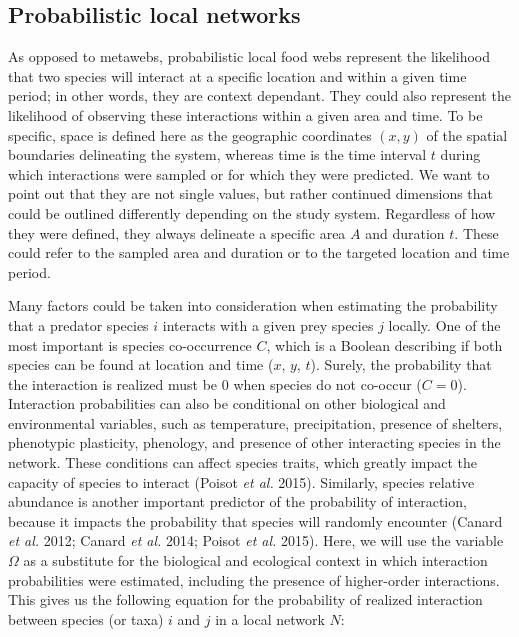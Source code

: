 \documentclass[11pt]{article}
\begin{document}
\hypertarget{probabilistic-local-networks}{%
\subsection{Probabilistic local
networks}\label{probabilistic-local-networks}}

As opposed to metawebs, probabilistic local food webs represent the
likelihood that two species will interact at a specific location and
within a given time period; in other words, they are context dependant.
They could also represent the likelihood of observing these interactions
within a given area and time. To be specific, space is defined here as
the geographic coordinates \((x, y)\) of the spatial boundaries
delineating the system, whereas time is the time interval \(t\) during
which interactions were sampled or for which they were predicted. We
want to point out that they are not single values, but rather continued
dimensions that could be outlined differently depending on the study
system. Regardless of how they were defined, they always delineate a
specific area \(A\) and duration \(t\). These could refer to the sampled
area and duration or to the targeted location and time period.

Many factors could be taken into consideration when estimating the
probability that a predator species \(i\) interacts with a given prey
species \(j\) locally. One of the most important is species
co-occurrence \(C\), which is a Boolean describing if both species can
be found at location and time (\(x\), \(y\), \(t\)). Surely, the
probability that the interaction is realized must be \(0\) when species
do not co-occur (\(C = 0\)). Interaction probabilities can also be
conditional on other biological and environmental variables, such as
temperature, precipitation, presence of shelters, phenotypic plasticity,
phenology, and presence of other interacting species in the network.
These conditions can affect species traits, which greatly impact the
capacity of species to interact (Poisot \emph{et al.} 2015). Similarly,
species relative abundance is another important predictor of the
probability of interaction, because it impacts the probability that
species will randomly encounter (Canard \emph{et al.} 2012; Canard
\emph{et al.} 2014; Poisot \emph{et al.} 2015). Here, we will use the
variable \(\Omega\) as a substitute for the biological and ecological
context in which interaction probabilities were estimated, including the
presence of higher-order interactions. This gives us the following
equation for the probability of realized interaction between species (or
taxa) \(i\) and \(j\) in a local network \(N\):
\end{document}
